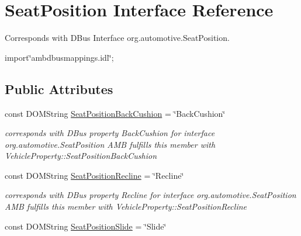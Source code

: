 \hypertarget{interfaceSeatPosition}{\section{Seat\+Position Interface Reference}
\label{interfaceSeatPosition}
}


Corresponds with D\+Bus Interface org.\+automotive.\+Seat\+Position.  




{\ttfamily import\char`\"{}ambdbusmappings.\+idl\char`\"{};}

\subsection*{Public Attributes}
\begin{DoxyCompactItemize}
\item 
\hypertarget{interfaceSeatPosition_ac8bece8802214d0e6818cdd684475c95}{const D\+O\+M\+String \hyperlink{interfaceSeatPosition_ac8bece8802214d0e6818cdd684475c95}{Seat\+Position\+Back\+Cushion} = \char`\"{}Back\+Cushion\char`\"{}}\label{interfaceSeatPosition_ac8bece8802214d0e6818cdd684475c95}

\begin{DoxyCompactList}\small\item\em corresponds with D\+Bus property Back\+Cushion for interface org.\+automotive.\+Seat\+Position A\+M\+B fulfills this member with Vehicle\+Property\+::\+Seat\+Position\+Back\+Cushion \end{DoxyCompactList}\item 
\hypertarget{interfaceSeatPosition_a36cdc356f63c78d136410e988a907ed5}{const D\+O\+M\+String \hyperlink{interfaceSeatPosition_a36cdc356f63c78d136410e988a907ed5}{Seat\+Position\+Recline} = \char`\"{}Recline\char`\"{}}\label{interfaceSeatPosition_a36cdc356f63c78d136410e988a907ed5}

\begin{DoxyCompactList}\small\item\em corresponds with D\+Bus property Recline for interface org.\+automotive.\+Seat\+Position A\+M\+B fulfills this member with Vehicle\+Property\+::\+Seat\+Position\+Recline \end{DoxyCompactList}\item 
\hypertarget{interfaceSeatPosition_a069910a5ab1f5be6bbc3b029dcdf0eec}{const D\+O\+M\+String \hyperlink{interfaceSeatPosition_a069910a5ab1f5be6bbc3b029dcdf0eec}{Seat\+Position\+Slide} = \char`\"{}Slide\char`\"{}}\label{interfaceSeatPosition_a069910a5ab1f5be6bbc3b029dcdf0eec}


\end{DoxyCompactItemize}
